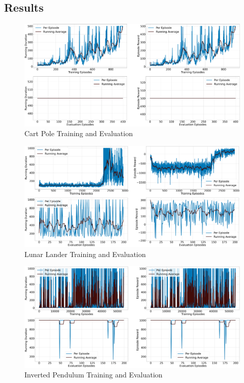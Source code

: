\documentclass{article} %
\begin{document}
\subsection{Results}
\begin{figure}[H]
    \begin{center}
        \includegraphics[width=\textwidth]{qac_cartpole.png}
    \end{center}
    \caption{Cart Pole Training and Evaluation}
\end{figure}

\begin{figure}[H]
    \begin{center}
        \includegraphics[width=\textwidth]{qac_lunar.png}
    \end{center}
    \caption{Lunar Lander Training and Evaluation}
\end{figure}

\begin{figure}[H]
    \begin{center}
        \includegraphics[width=\textwidth]{qac_invpendulum.png}
    \end{center}
    \caption{Inverted Pendulum Training and Evaluation}
\end{figure}
\end{document}
